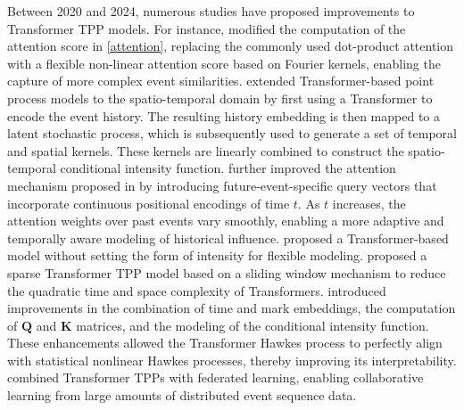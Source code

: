 \documentclass[10pt]{article} %
\begin{document}




Between 2020 and 2024, numerous studies have proposed improvements to Transformer TPP models.  
For instance, \citet{zhu2021deep} modified the computation of the attention score in \cref{attention}, replacing the commonly used dot-product attention with a flexible non-linear attention score based on Fourier kernels, enabling the capture of more complex event similarities. 
\citet{zhou2022neural} extended Transformer-based point process models to the spatio-temporal domain by first using a Transformer to encode the event history. The resulting history embedding is then mapped to a latent stochastic process, which is subsequently used to generate a set of temporal and spatial kernels. These kernels are linearly combined to construct the spatio-temporal conditional intensity function. 
\citet{yang2022transformer} further improved the attention mechanism proposed in \citet{simiao2020transformer, zhang2020self} by introducing future-event-specific query vectors that incorporate continuous positional encodings of time \(t\). As \(t\) increases, the attention weights over past events vary smoothly, enabling a more adaptive and temporally aware modeling of historical influence. 
\citet{mei2021transformer} proposed a Transformer-based model without setting the form of intensity for flexible modeling. 
\citet{li2023sparse} proposed a sparse Transformer TPP model based on a sliding window mechanism to reduce the quadratic time and space complexity of Transformers.  
\citet{meng2024interpretable} introduced improvements in the combination of time and mark embeddings, the computation of \(\mathbf{Q}\) and \(\mathbf{K}\) matrices, and the modeling of the conditional intensity function. These enhancements allowed the Transformer Hawkes process to perfectly align with statistical nonlinear Hawkes processes, thereby improving its interpretability. 
\citet{wang2024federated} combined Transformer TPPs with federated learning, enabling collaborative learning from large amounts of distributed event sequence data. 
\end{document}
